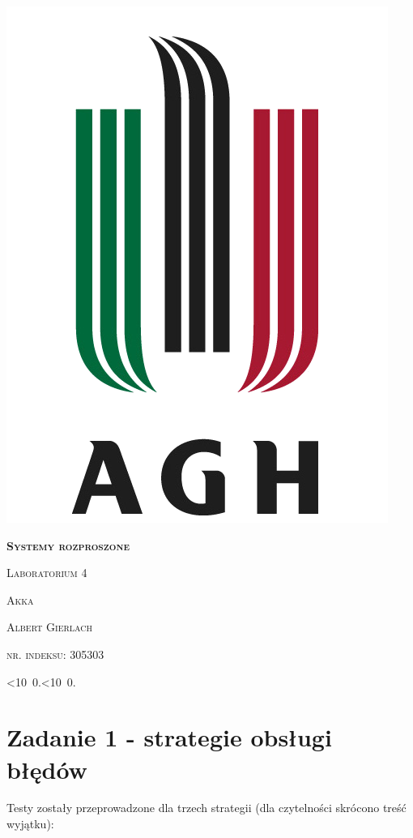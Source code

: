 \documentclass[12pt]{article}
\def\mydate{\leavevmode\hbox{\twodigits\day.\twodigits\month.\the\year}}
\def\twodigits#1{\ifnum#1<10 0\fi\the#1}
\begin{document}
\thispagestyle{empty}
\begin{center}
\begin{minipage}{0.75\linewidth}
    \centering
    \includegraphics[width=0.45\linewidth]{agh_logo2.png}
    \par
    \vspace{2cm}
    {\bfseries{\scshape{\Huge  Systemy rozproszone}}}
    \par
    \vspace{1.7cm}
    {\scshape{\Large Laboratorium 4}}
    \par
    \vspace{0.8cm}
    {\scshape{\Large Akka}}
    \par
    \vspace{3cm}

    {\scshape{\Large Albert Gierlach}}\par
    \vspace{0.6cm}
    {\scshape{\Large nr. indeksu: 305303}}\par
    \vspace{1cm}

    {\Large \mydate}
\end{minipage}
\end{center}
\clearpage



\section{Zadanie 1 - strategie obsługi błędów}
Testy zostały przeprowadzone dla trzech strategii (dla czytelności skrócono treść wyjątku):
\end{document}
